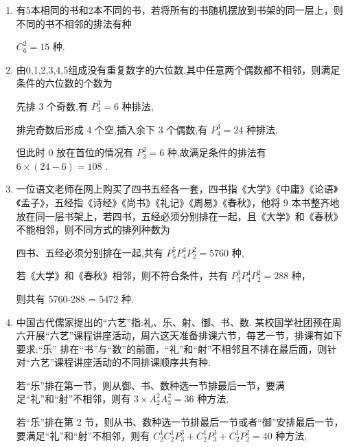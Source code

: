 \begin{enumerate}
\begin{enumerate}
        \item 有5本相同的书和2本不同的书，若将所有的书随机摆放到书架的同一层上，则不同的书不相邻的排法有种
        \begin{jieda}
            $C_6^2 = 15$ 种.
        \end{jieda}

        \item 由0,1,2,3,4,5组成没有重复数字的六位数,其中任意两个偶数都不相邻，则满足条件的六位数的个数为
        \begin{jieda}
            先排 3 个奇数,有 $P_{3}^{3} = 6$ 种排法,
            
            排完奇数后形成 4 个空,插入余下 3 个偶数,有 $P_{4}^{3} = {24}$ 种排法,
            
            但此时 0 放在首位的情况有 $P_{3}^{2} = 6$ 种,故满足条件的排法有 $6 \times  \left( {{24} - 6}\right)  = {108}$ .
        \end{jieda}
        
        \item 一位语文老师在网上购买了四书五经各一套，四书指《大学》《中庸》《论语》《孟子》，五经指《诗经》《尚书》《礼记》《周易》《春秋》，他将 9 本书整齐地放在同一层书架上，若四书，五经必须分别排在一起，且《大学》和《春秋》不能相邻，则不同方式的排列种数为
        \begin{jieda}
            四书、五经必须分别排在一起,共有 $P_{5}^{5}P_{4}^{4}P_{2}^{2} = {5760}$ 种,
            
            若《大学》和《春秋》相邻，则不符合条件，共有 $P_{3}^{3}P_{4}^{4}P_{2}^{2} = {288}$ 种，
            
            则共有 5760-288 = 5472 种.
        \end{jieda}
        
        \item 中国古代儒家提出的“六艺”指:礼、乐、射、御、书、数. 某校国学社团预在周六开展“六艺”课程讲座活动，周六这天准备排课六节，每艺一节，排课有如下要求:“乐” 排在“书”与“数”的前面，“礼”和“射”不相邻且不排在最后面，则针对“六艺”课程讲座活动的不同排课顺序共有种.
        \begin{jieda}
            若“乐”排在第一节，则从御、书、数种选一节排最后一节，要满足“礼”和“射”不相邻，则有 $3 \times  {A}_{2}^{2}{A}_{3}^{2} = {36}$ 种方法,
            
            若“乐”排在第 2 节，则从书、数种选一节排最后一节或者“御”安排最后一节，要满足“礼”和“射”不相邻，则有 ${{C}}_{2}^{1}{{C}}_{2}^{1}P_{3}^{3} + {{C}}_{2}^{1}P_{3}^{3} + {{C}}_{2}^{1}P_{2}^{2} = {40}$ 种方法,
            

\end{jieda}
\end{enumerate}
\end{enumerate}
